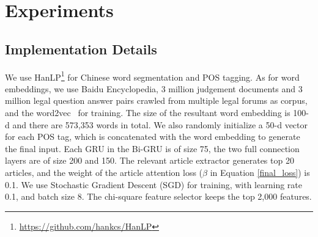 \section{Experiments}
\subsection{Implementation Details}
We use HanLP\footnote{\url{https://github.com/hankcs/HanLP}} for Chinese word segmentation and POS tagging. 
As for word embeddings, we use Baidu Encyclopedia, 3 million judgement documents and 3 million legal question answer pairs crawled from multiple legal forums as corpus, and the word2vec~\cite{mikolov2013distributed} for training. 
The size of the resultant word embedding is 100-d and there are 573,353 words in total. 
We also randomly initialize a 50-d vector for each POS tag, which is concatenated with the word embedding to generate the final input.
Each GRU in the Bi-GRU is of size 75, the two full connection layers are of size 200 and 150.
The relevant article extractor generates top 20 articles, and the weight of the article attention loss ($\beta$ in Equation \ref{final_loss}) is 0.1. 
We use Stochastic Gradient Descent (SGD) for training, with learning rate 0.1, and batch size 8.
The chi-square feature selector keeps the top 2,000 features.


